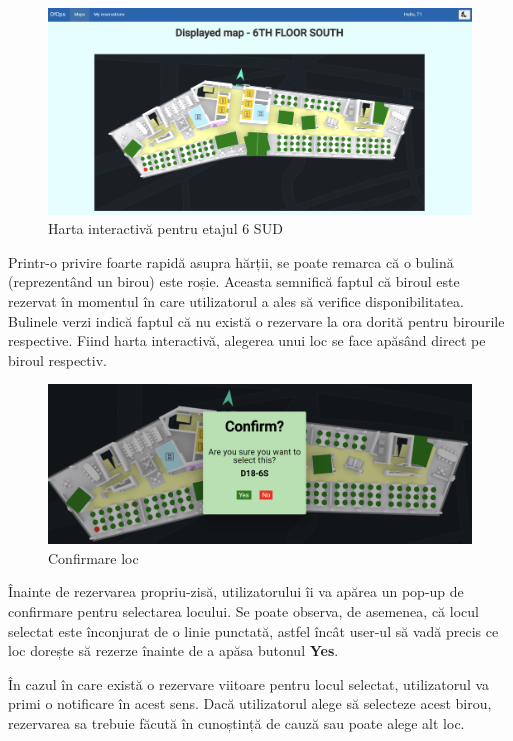 \begin{figure}[!htb]
    \centering
    \includegraphics[width=0.9\linewidth]{images/hartaint.png}
    \caption{Harta interactivă pentru etajul 6 SUD}
    \label{fig:hartaint}
\end{figure}

Printr-o privire foarte rapidă asupra hărții, se poate remarca că o bulină (reprezentând un birou) este roșie. Aceasta semnifică faptul că biroul este rezervat în momentul în care utilizatorul a ales să verifice disponibilitatea. Bulinele verzi indică faptul că nu există o rezervare la ora dorită pentru birourile respective. Fiind harta interactivă, alegerea unui loc se face apăsând direct pe biroul respectiv.

\newpage

\begin{figure}[!htb]
    \centering
    \includegraphics[width=0.9\linewidth]{images/rezerv.png}
    \caption{Confirmare loc}
    \label{fig:rezerv}
\end{figure}

Înainte de rezervarea propriu-zisă, utilizatorului îi va apărea un pop-up de confirmare pentru selectarea locului. Se poate observa, de asemenea, că locul selectat este înconjurat de o linie punctată, astfel încât user-ul să vadă precis ce loc dorește să rezerze înainte de a apăsa butonul \textbf{Yes}.

În cazul în care există o rezervare viitoare pentru locul selectat, utilizatorul va primi o notificare în acest sens. Dacă utilizatorul alege să selecteze acest birou, rezervarea sa trebuie făcută în cunoștință de cauză sau poate alege alt loc.

